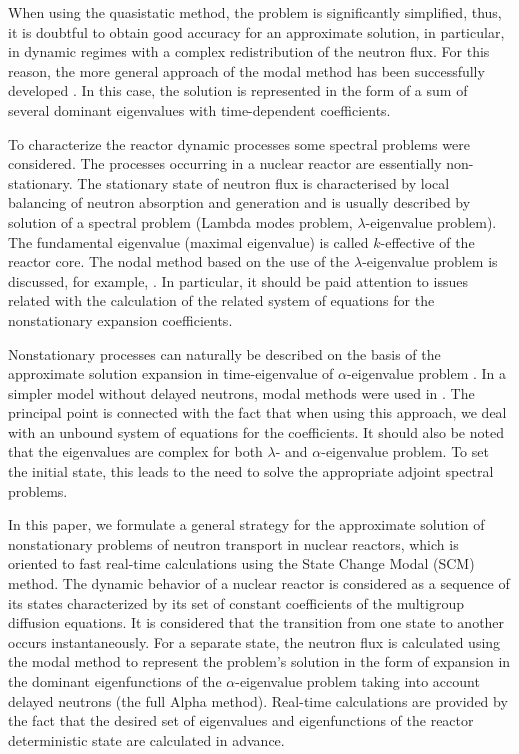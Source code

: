 \documentclass[authoryear]{elsarticle}
\begin{document}
When using the quasistatic method, the problem is significantly simplified, thus, it is doubtful to obtain good accuracy for an approximate solution, in particular, in dynamic regimes with a complex redistribution of the neutron flux. For this reason, the more general approach of the modal method has been successfully developed  \citep{stacey1967modal,stacey1969space,sutton1996diffusion}.
In this case, the solution is represented in the form of a sum of several dominant eigenvalues with time-dependent coefficients.

To characterize the reactor dynamic processes some spectral problems  \citep{Bell1970,hetrick1971dynamics,stewart1976spectral,stacey} were considered. The processes occurring in a nuclear reactor are essentially non-stationary. 
The stationary state of neutron flux is characterised by local balancing of neutron absorption and generation
and is usually described by solution of a spectral problem (Lambda modes problem, $\lambda$-eigenvalue problem).
The fundamental eigenvalue (maximal eigenvalue) is called $k$-effective of the reactor core.
The nodal method based on the use of the  $\lambda$-eigenvalue problem is discussed, for example,  \cite{verdu1998modal,miro2002nodal,gonzalez2009high}. In particular, it should be paid attention to issues related with the calculation of the related system of equations for the nonstationary expansion coefficients. 

Nonstationary processes can naturally be described on the basis of the approximate solution expansion in time-eigenvalue of  $\alpha$-eigenvalue problem \citep{ginestar2002transient,verdu20103d,verdu2014modal}.
In a simpler model without delayed neutrons, modal methods were used in  \cite{modak2007scheme}.
The principal point is connected with the fact that when using this approach, we deal with an unbound system of equations for the coefficients. It should also be noted that the eigenvalues are complex for both   $\lambda$- and 
$\alpha$-eigenvalue problem. To set the initial state, this leads to the need to solve the appropriate adjoint spectral problems.

In this paper, we formulate a general strategy for the approximate solution of nonstationary problems of neutron transport in nuclear reactors, which is oriented to fast real-time calculations using the State Change Modal (SCM) method. The dynamic behavior of a nuclear reactor is considered as a sequence of its states characterized by its set of constant coefficients of the multigroup diffusion equations. It is considered that the transition from one state to another occurs instantaneously. For a separate state, the neutron flux is calculated using the modal method to represent the problem’s solution in the form of expansion in the dominant eigenfunctions of the  $\alpha$-eigenvalue problem
taking into account delayed neutrons (the full Alpha method). Real-time calculations are provided by the fact that the desired set of eigenvalues and eigenfunctions of the reactor deterministic state are calculated in advance.
\end{document}
